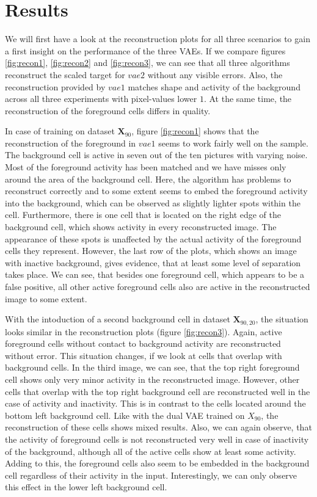 \documentclass[12pt]{report}
\theoremstyle{definition}
\begin{document}
\section{Results}
We will first have a look at the reconstruction plots for all three scenarios to gain a first insight on the performance of the three VAEs.
If we compare figures \ref{fig:recon1}, \ref{fig:recon2} and \ref{fig:recon3}, we can see that all three algorithms reconstruct the scaled target for $vae2$ without any visible errors. Also, the reconstruction provided by $vae1$ matches shape and activity of the background across all three experiments with pixel-values lower $1$. At the same time, the reconstruction of the foreground cells differs in quality.

In case of training on dataset $\mathbf{X}_{90}$, figure \ref{fig:recon1} shows that the reconstruction of the foreground in $vae1$ seems to work fairly well on the sample. The background cell is active in seven out of the ten pictures with varying noise. Most of the foreground activity has been matched and we have misses only around the area of the background cell. Here, the algorithm has problems to reconstruct correctly and to some extent seems to embed the foreground activity into the background, which can be observed as slightly lighter spots within the cell. Furthermore, there is one cell that is located on the right edge of the background cell, which shows activity in every reconstructed image. The appearance of these spots is unaffected by the actual activity of the foreground cells they represent. However, the last row of the plots, which shows an image with inactive background, gives evidence, that at least some level of separation takes place. We can see, that besides one foreground cell, which appears to be a false positive, all other active foreground cells also are active in the reconstructed image to some extent.

With the intoduction of a second background cell in dataset $\mathbf{X}_{90, 20}$, the situation looks similar in the reconstruction plots (figure \ref{fig:recon3}). Again, active foreground cells without contact to background activity are reconstructed without error. This situation changes, if we look at cells that overlap with background cells. In the third image, we can see, that the top right foreground cell shows only very minor activity in the reconstructed image. However, other cells that overlap with the top right background cell are reconstructed well in the case of activity and inactivity. This is in contrast to the cells located around the bottom left background cell. Like with the dual VAE trained on $X_{90}$, the reconstruction of these cells shows mixed results. Also, we can again observe, that the activity of foreground cells is not reconstructed very well in case of inactivity of the background, although all of the active cells show at least some activity. Adding to this, the foreground cells also seem to be embedded in the background cell regardless of their activity in the input. Interestingly, we can only observe this effect in the lower left background cell.
\end{document}
